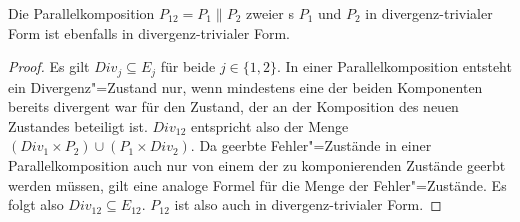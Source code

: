 \begin{Lem}
  \label{DivFreiParallelLem}
  Die Parallelkomposition $P_{12} = P_1\|P_2$ zweier \MEIO{}s $P_1$ und $P_2$
  in divergenz-trivialer Form ist ebenfalls in divergenz-trivialer Form.
\end{Lem}
\begin{proof}
  Es gilt $Div _j \subseteq E_j$ für beide $j\in\{1,2\}$. In einer
  Parallelkomposition entsteht ein Divergenz"=Zustand nur, wenn mindestens
  eine der beiden Komponenten bereits divergent war für den Zustand, der an der
  Komposition des neuen Zustandes beteiligt ist. $Div _{12}$ entspricht
  also der Menge $(Div _1 \times P_2) \cup (P_1 \times Div _2)$. Da geerbte
  Fehler"=Zustände in einer Parallelkomposition auch nur von einem der zu
  komponierenden Zustände geerbt werden müssen, gilt eine analoge Formel für
  die Menge der Fehler"=Zustände. Es folgt also $Div _{12} \subseteq E _{12}$.
  $P_{12}$ ist also auch in divergenz-trivialer Form.
\end{proof}

